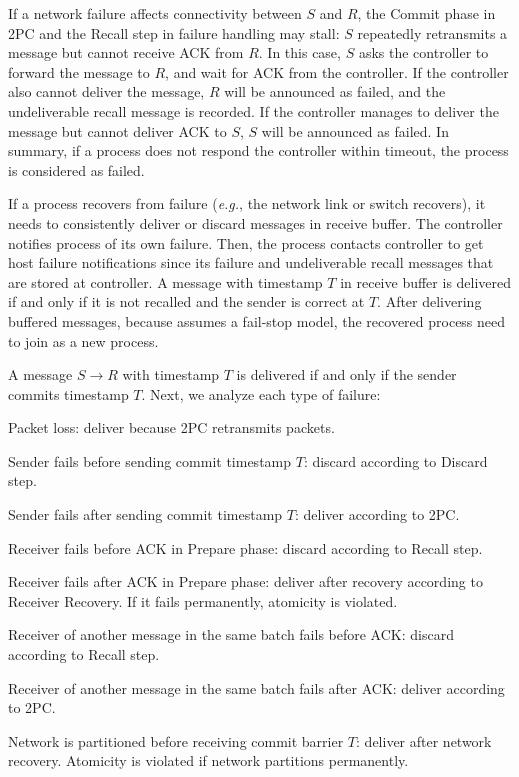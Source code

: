  If a network failure affects connectivity between $S$ and $R$, the Commit phase in 2PC and the Recall step in failure handling may stall: $S$ repeatedly retransmits a message but cannot receive ACK from $R$. In this case, $S$ asks the controller to forward the message to $R$, and wait for ACK from the controller. If the controller also cannot deliver the message, $R$ will be announced as failed, and the undeliverable recall message is recorded. If the controller manages to deliver the message but cannot deliver ACK to $S$, $S$ will be announced as failed. In summary, if a process does not respond the controller within timeout, the process is considered as failed.

 If a process recovers from failure (\emph{e.g.}, the network link or switch recovers), it needs to consistently deliver or discard messages in receive buffer. The controller notifies process of its own failure. Then, the process contacts controller to get host failure notifications since its failure and undeliverable recall messages that are stored at controller. A message with timestamp $T$ in receive buffer is delivered if and only if it is not recalled and the sender is correct at $T$. After delivering buffered messages, because \sys{} assumes a fail-stop model, the recovered process need to join \sys{} as a new process.

A message $S \rightarrow R$ with timestamp $T$ is delivered if and only if the sender commits timestamp $T$. Next, we analyze each type of failure:
\begin{ecompact}
\item Packet loss: deliver because 2PC retransmits packets.
\item Sender fails before sending commit timestamp $T$: discard according to Discard step.
\item Sender fails after sending commit timestamp $T$: deliver according to 2PC.
\item Receiver fails before ACK in Prepare phase: discard according to Recall step.
\item Receiver fails after ACK in Prepare phase: deliver after recovery according to Receiver Recovery. If it fails permanently, atomicity is violated.
\item Receiver of another message in the same batch fails before ACK: discard according to Recall step.
\item Receiver of another message in the same batch fails after ACK: deliver according to 2PC.
\item Network is partitioned before receiving commit barrier $T$: deliver after network recovery. Atomicity is violated if network partitions permanently.
\end{ecompact}

